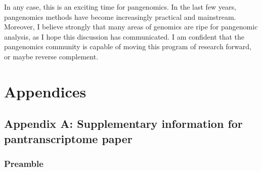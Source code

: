 \documentclass[11pt]{ucthesis}
\begin{document}
In any case, this is an exciting time for pangenomics. In the last few years, pangenomics methods have become increasingly practical and mainstream. Moreover, I believe strongly that many areas of genomics are ripe for pangenomic analysis, as I hope this discussion has communicated. I am confident that the pangenomics community is capable of moving this program of research forward, or maybe reverse complement.



\renewcommand{\figurename}{Supplementary Figure}
\renewcommand{\tablename}{Supplementary Table}

\appendix

\part{Appendices}

\chapter{Appendix A: Supplementary information for pantranscriptome paper}

\section{Preamble}
\end{document}

